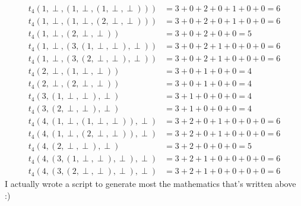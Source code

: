 \documentclass{article}
\begin{document}
\begin{tasks}
{            \begin{displaymath}
                \begin{aligned}
                    t_4(1, \perp, (1, \perp, (1, \perp, \perp))) &= 3 + 0 + 2 + 0 + 1 + 0 + 0 = 6 \\
                    t_4(1, \perp, (1, \perp, (2, \perp, \perp))) &= 3 + 0 + 2 + 0 + 1 + 0 + 0 = 6 \\
                    t_4(1, \perp, (2, \perp, \perp)) &= 3 + 0 + 2 + 0 + 0 = 5 \\
                    t_4(1, \perp, (3, (1, \perp, \perp), \perp)) &= 3 + 0 + 2 + 1 + 0 + 0 + 0 = 6 \\
                    t_4(1, \perp, (3, (2, \perp, \perp), \perp)) &= 3 + 0 + 2 + 1 + 0 + 0 + 0 = 6 \\
                    t_4(2, \perp, (1, \perp, \perp)) &= 3 + 0 + 1 + 0 + 0 = 4 \\
                    t_4(2, \perp, (2, \perp, \perp)) &= 3 + 0 + 1 + 0 + 0 = 4 \\
                    t_4(3, (1, \perp, \perp), \perp) &= 3 + 1 + 0 + 0 + 0 = 4 \\
                    t_4(3, (2, \perp, \perp), \perp) &= 3 + 1 + 0 + 0 + 0 = 4 \\
                    t_4(4, (1, \perp, (1, \perp, \perp)), \perp) &= 3 + 2 + 0 + 1 + 0 + 0 + 0 = 6 \\
                    t_4(4, (1, \perp, (2, \perp, \perp)), \perp) &= 3 + 2 + 0 + 1 + 0 + 0 + 0 = 6 \\
                    t_4(4, (2, \perp, \perp), \perp) &= 3 + 2 + 0 + 0 + 0 = 5 \\
                    t_4(4, (3, (1, \perp, \perp), \perp), \perp) &= 3 + 2 + 1 + 0 + 0 + 0 + 0 = 6 \\
                    t_4(4, (3, (2, \perp, \perp), \perp), \perp) &= 3 + 2 + 1 + 0 + 0 + 0 + 0 = 6
                \end{aligned}
            \end{displaymath}
            I actually wrote a script to generate most the mathematics that's written above :)
        }
    \end{tasks}
\end{document}
